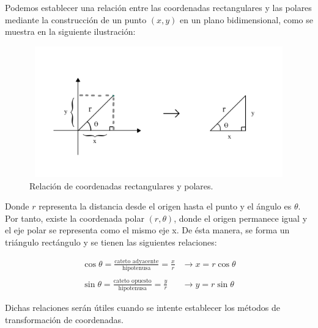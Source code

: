 Podemos establecer una relación entre las coordenadas rectangulares y las polares mediante la construcción de un punto $(x,y)$ en un plano bidimensional, como se muestra en la siguiente ilustración:

\begin{figure}[H]
  \centering
  \includegraphics[width=11.17cm, height=5.67cm]{img/graph/relacion_r}
  \caption{Relación de coordenadas rectangulares y polares.}
  \label{relacion_de_coordenadas}
\end{figure}

Donde ${r}$ representa la distancia desde el origen hasta el punto y el ángulo es ${\theta}$. Por tanto, existe la coordenada polar ${\left(r,\theta\right)}$, donde el origen permanece igual y el eje polar se representa como el mismo eje x. De ésta manera, se forma un triángulo rectángulo y se tienen las siguientes relaciones:

\begin{eqnarray*}
  \cos\theta = \frac{\text{cateto adyacente}}{\text{hipotenusa}} = \frac{x}{r} &\rightarrow x = r\cos\theta\\\\
  \sin\theta = \frac{\text{cateto opuesto}}{\text{hipotenusa}} = \frac{y}{r} &\rightarrow y = r\sin\theta
\end{eqnarray*}

\vspace{4mm}
Dichas relaciones serán útiles cuando se intente establecer los métodos de transformación de coordenadas.
